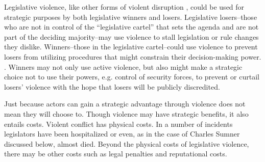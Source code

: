 \documentclass[a4paper]{article}\usepackage[]{graphicx}\usepackage[]{color}
\begin{document}
Legislative violence, like other forms of violent disruption \citep[]{Beaulieu2008,BeaulieuForthcoming,wilkinson2006}, could be used for strategic purposes by both legislative winners and losers. Legislative losers--those who are not in control of the ``legislative cartel''  that sets the agenda \citep{cox2007} and are not part of the deciding majority--may use violence to stall legislation or rule changes they dislike. Winners--those in the legislative cartel--could use violence to prevent losers from utilizing procedures that might constrain their decision-making power.  \citep{Spary2013}. Winners may not only use active violence, but also might make a strategic choice not to use their powers, e.g. control of security forces, to prevent or curtail losers' violence with the hope that losers will be publicly discredited.

Just because actors can gain a strategic advantage  through violence does not mean they will choose to. Though violence may have strategic benefits, it also entails costs. Violent conflict has physical costs. In a number of incidents legislators have been hospitalized or even, as in the case of Charles Sumner discussed below, almost died. Beyond the physical costs of legislative violence, there may be other costs such as legal penalties and reputational costs.
\end{document}
